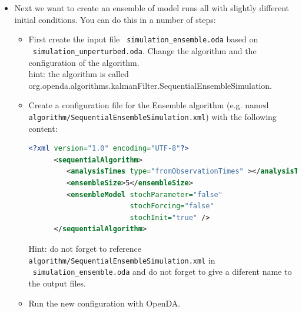 \begin{itemize}
      To create a movie with both results in python type:
      \begin{lstlisting}[language=Python,frame=single,caption={Python initialize}]
      import simulation_unperturbed_results as unperturbed
      import simulation_perturbed_results as perturbed
      p.plot_movie(unperturbed.model_time,unperturbed.x,perturbed.x)
      \end{lstlisting}

      To create a time-series plot with both results in Python type:
      \begin{lstlisting}[language=Python,frame=single,caption={Python}]
      plt.subplot(2,1,1)
      plt.plot(unperturbed.model_time,unperturbed.x[:,0],"b") 
      #python counts starting at 0
      plt.plot(perturbed.model_time,perturbed.x[:,0],"g")
      plt.ylabel(r"$\theta_1$") # use latex for label
      plt.subplot(2,1,2)
      plt.plot(unperturbed.model_time,unperturbed.x[:,1],"b")
      plt.plot(perturbed.model_time,perturbed.x[:,1],"g")
      plt.ylabel(r"$\theta_2$")
      plt.show() 
      \end{lstlisting}
      
\item Next we want to create an ensemble of model runs all with slightly different initial conditions. 
      You can do this in a number of steps:
      \begin{itemize}
      \item First create the input file \texttt{ simulation\_ensemble.oda} based on\\
            \texttt{ simulation\_unperturbed.oda}. Change the algorithm and the
            configuration of the algorithm.\\
            hint: the algorithm is called \\
            org.openda.algorithms.kalmanFilter.SequentialEnsembleSimulation.
      \item Create a configuration file for the Ensemble algorithm (e.g. named
            \texttt{ algorithm/SequentialEnsembleSimulation.xml}) with the following content:
      \begin{lstlisting}[language=XML,frame=single,caption={XML-input for sequentialAlgorithm}]
      <?xml version="1.0" encoding="UTF-8"?>
      <sequentialAlgorithm>
         <analysisTimes type="fromObservationTimes" ></analysisTimes>
         <ensembleSize>5</ensembleSize>
         <ensembleModel stochParameter="false"
                        stochForcing="false"
                        stochInit="true" />
      </sequentialAlgorithm>
      \end{lstlisting}
      Hint: do not forget to reference \texttt{ algorithm/SequentialEnsembleSimulation.xml} in \\ \texttt{ simulation\_ensemble.oda}
      and do not forget to give a diferent name to the output files.
      \item Run the new configuration with OpenDA.


\end{itemize}
\end{itemize}
